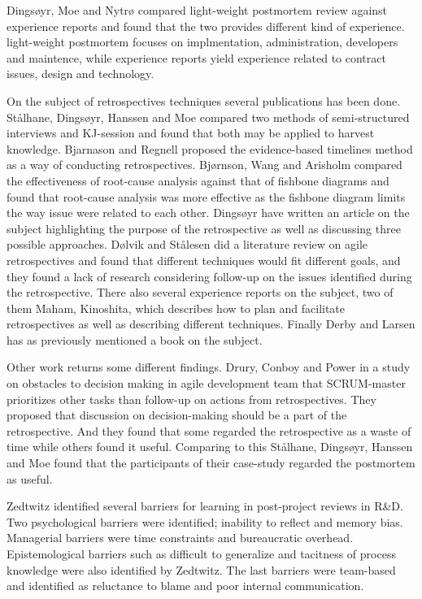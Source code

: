 Dingsøyr, Moe and Nytrø compared light-weight postmortem review against experience reports and found that the two provides different kind of experience. light-weight postmortem focuses on implmentation, administration, developers and maintence, while experience reports yield experience related to contract issues, design and technology. 

On the subject of retrospectives techniques several publications has been done. Stålhane, Dingsøyr, Hanssen and Moe\cite{Hanssen2003} compared two methods of semi-structured interviews and KJ-session and found that both may be applied to harvest knowledge. Bjarnason and Regnell\cite{Bjarnason2012} proposed the evidence-based timelines method as a way of conducting retrospectives. Bjørnson, Wang and Arisholm\cite{bjornson2009} compared the effectiveness of root-cause analysis against that of fishbone diagrams and found that root-cause analysis was more effective as the fishbone diagram limits the way issue were related to each other. Dingsøyr\cite{Dingsoyr2004} have written an article on the subject highlighting the purpose of the retrospective as well as discussing three possible approaches. Dølvik and Stålesen\cite{Dolvik2014} did a literature review on agile retrospectives and found that different techniques would fit different goals, and they found a lack of research considering follow-up on the issues identified during the retrospective. There also several experience reports on the subject, two of them Maham\cite{Maham2008}, Kinoshita\cite{Kinoshita2008}, which describes how to plan and facilitate retrospectives as well as describing different techniques. Finally Derby and Larsen\cite{Larsen2006} has as previously mentioned a book on the subject. 

Other work returns some different findings. Drury, Conboy and Power\cite{Drury2012} in a study on obstacles to decision making in agile development team that SCRUM-master prioritizes other tasks than follow-up on actions from retrospectives. They proposed that discussion on decision-making should be a part of the retrospective. And they found that some regarded the retrospective as a waste of time while others found it useful. Comparing to this Stålhane, Dingsøyr, Hanssen and Moe\cite{Hanssen2003} found that the participants of their case-study regarded the postmortem as useful. 

Zedtwitz\cite{Zedtwitz2002} identified several barriers for learning in post-project reviews in R\&D. Two psychological barriers were identified; inability to reflect and memory bias. Managerial barriers were time constraints and bureaucratic overhead. Epistemological barriers such as difficult to generalize and tacitness of process knowledge were also identified by Zedtwitz. The last barriers were team-based and identified as reluctance to blame and poor internal communication. 

